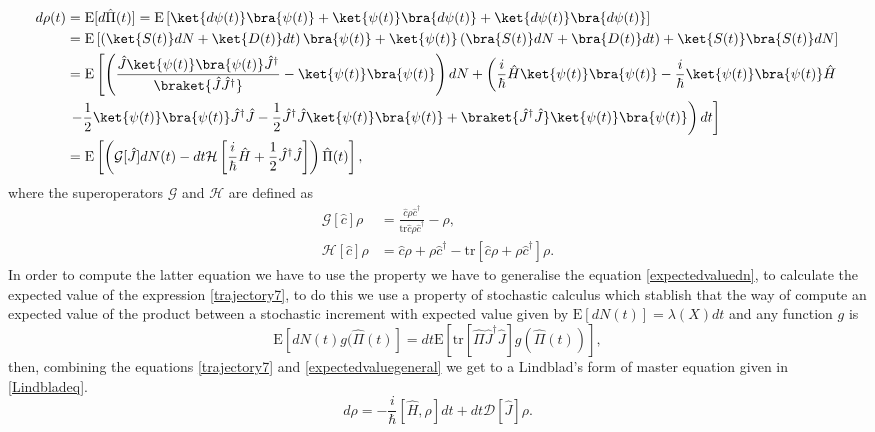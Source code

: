 \begin{align}
d\rho(t)&=\text{E}[d\hat{\Pi}(t)]=\text{E}\left[\ket{d\psi(t)}\bra{\psi(t)}+\ket{\psi(t)}\bra{d\psi(t)}+\ket{d\psi(t)}\bra{d\psi(t)}\right]\nonumber\\
&=\text{E}\left[\left(\ket{S(t)}dN+\ket{D(t)}dt\right)\bra{\psi(t)}+\ket{\psi(t)}\left(\bra{S(t)}dN+\bra{D(t)}dt\right)+\ket{S(t)}\bra{S(t)}dN\right]\nonumber\\
&=\text{E}\left[\left(\frac{\hat{J}\ket{\psi(t)}\bra{\psi(t)}\hat{J}^{\dagger}}{\braket{\hat{J}\hat{J}^{\dagger}}}-\ket{\psi(t)}\bra{\psi(t)}\right)dN+\left(\frac{i}{\hbar}\hat{H}\ket{\psi(t)}\bra{\psi(t)}-\frac{i}{\hbar}\ket{\psi(t)}\bra{\psi(t)}\hat{H}\right.\right.\nonumber\\
&\left.\left.-\frac{1}{2}\ket{\psi(t)}\bra{\psi(t)}\hat{J}^{\dagger}\hat{J}-\frac{1}{2}\hat{J}^{\dagger}\hat{J}\ket{\psi(t)}\bra{\psi(t)}+\braket{\hat{J}^{\dagger}\hat{J}}\ket{\psi(t)}\bra{\psi(t)}\right)dt\right]\nonumber\\
&=\text{E}\left[\left(\mathcal{G}[\hat{J}]dN(t)-dt\mathcal{H}\left[\frac{i}{\hbar}\hat{H}+\frac{1}{2}\hat{J}^{\dagger}\hat{J}\right]\right)\hat{\Pi}(t)\right],\label{trajectory7}
\end{align}
where the superoperators $\mathcal{G}$ and $\mathcal{H}$ are defined as
\begin{align}
\mathcal{G}[\hat{c}]\rho&=\frac{\hat{c}\rho\hat{c}^{\dagger}}{\text{tr}{\hat{c}\rho\hat{c}^{\dagger}}}-\rho, \label{superoperator1}\\
\mathcal{H}[\hat{c}]\rho&=\hat{c}\rho+\rho\hat{c}^{\dagger}-\text{tr}[\hat{c}\rho+\rho\hat{c}^{\dagger}]\rho. \label{superoperator2}
\end{align}
In order to compute the latter equation we have to use the property we have to generalise the equation \eqref{expectedvaluedn}, to calculate the expected value of the expression \eqref{trajectory7}, to do this we use a property of stochastic calculus which stablish that the way of compute an expected value of the product between a stochastic increment with expected value given by $\text{E}[dN(t)]=\lambda(X)dt$ and any function $g$ is
\begin{equation}
\text{E}[dN(t)g(\hat{\Pi}(t)]=dt\text{E}[\text{tr}[\hat{\Pi}\hat{J}^{\dagger}\hat{J}]g(\hat{\Pi}(t))],
\label{expectedvaluegeneral}
\end{equation}
then, combining the equations \eqref{trajectory7} and \eqref{expectedvaluegeneral} we get to a Lindblad's form of master equation given in \eqref{Lindbladeq}.
\begin{equation}
d\rho=-\frac{i}{\hbar}[\hat{H},\rho]dt+dt\mathcal{D}[\hat{J}]\rho.
\label{Lindbladeq2}
\end{equation}
